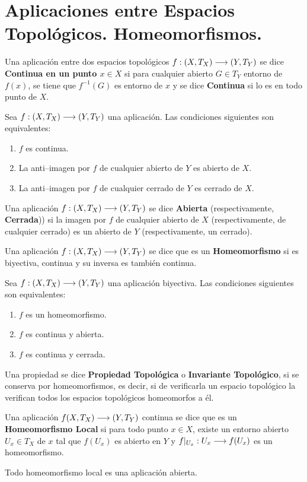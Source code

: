 \documentclass[cursovd_portada.tex]{subfiles}
\begin{document}
\section{Aplicaciones entre Espacios Topol\'{o}gicos. Ho\-meo\-mor\-fis\-mos.}
\begin{defi}
Una aplicaci\'{o}n entre dos espacios topol\'{o}gicos $f:(X,T_X)\longrightarrow (Y,T_Y)$ se dice {\bf Continua en un punto $x\in X$}
si para cualquier abierto $G\in T_Y$ entorno de $f(x)$, se tiene que $f^{-1}(G)$ es entorno de $x$ y se dice {\bf
Continua} si lo es en todo punto de $X$.
\end{defi}
\begin{teorema}
Sea $f:(X,T_X)\longrightarrow (Y,T_Y)$ una aplicaci\'{o}n. Las condiciones siguientes son equivalentes:
\begin{enumerate}
\item $f$ es continua.
\item La anti--imagen por $f$ de cualquier abierto de $Y$ es abierto de $X$.
\item La anti--imagen por $f$ de cualquier cerrado de $Y$ es cerrado de $X$.
\end{enumerate}
\end{teorema}
\begin{defi}
Una aplicaci\'{o}n $f:(X,T_X)\longrightarrow (Y,T_Y)$ se dice {\bf Abierta} (respectivamente, {\bf Cerrada})) si la imagen por $f$
de cualquier abierto de $X$ (respectivamente, de cualquier cerrado) es un abierto de $Y$ (respectivamente, un
cerrado).
\end{defi}
\begin{defi} Una aplicaci\'{o}n $f:(X,T_X)\longrightarrow (Y,T_Y)$ se dice que es un {\bf Homeomorfismo} si es biyectiva, continua
y su inversa es tambi\'{e}n continua.
\end{defi}
\begin{teorema}
Sea $f:(X,T_X)\longrightarrow (Y,T_Y)$ una aplicaci\'{o}n biyectiva. Las condiciones siguientes son equivalentes:
\begin{enumerate}
\item $f$ es un homeomorfismo.
\item $f$ es continua y abierta.
\item $f$ es continua y cerrada.
\end{enumerate}
\end{teorema}
\begin{defi} Una propiedad se dice {\bf Propiedad Topol\'{o}gica} o {\bf Invariante Topol\'{o}gico}, si se conserva por
homeomorfismos, es decir, si de verificarla un espacio topol\'{o}gico la verifican todos los espacios topol\'{o}gicos
homeomorfos a \'{e}l.
\end{defi}
\begin{defi}
Una aplicaci\'{o}n $f(X,T_X)\longrightarrow (Y,T_Y)$ continua se dice que es un {\bf Homeomorfismo Local} si para todo punto $x\in
X$, existe un entorno abierto $U_x\in T_X$ de $x$ tal que $f(U_x)$ es abierto en $Y$ y $f|_{U_x}:U_x\longrightarrow f(U_x)$ es
un homeomorfismo.
\end{defi}
\begin{prop}
Todo homeomorfismo local es una aplicaci\'{o}n abierta.
\end{prop}
\end{document}
